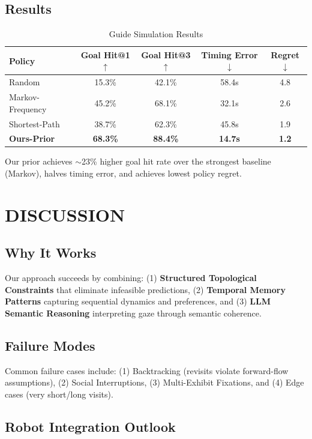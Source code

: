 \documentclass{letterpaper,article}
\begin{document}
\subsection{Results}

\begin{table}[h]
\centering
\caption{Guide Simulation Results}
\begin{tabular}{lcccc}
\toprule
Policy & Goal Hit@1$\uparrow$ & Goal Hit@3$\uparrow$ & Timing Error$\downarrow$ & Regret$\downarrow$ \\
\midrule
Random & 15.3\% & 42.1\% & 58.4s & 4.8 \\
Markov-Frequency & 45.2\% & 68.1\% & 32.1s & 2.6 \\
Shortest-Path & 38.7\% & 62.3\% & 45.8s & 1.9 \\
\rowcolor{green!10} \textbf{Ours-Prior} & \textbf{68.3\%} & \textbf{88.4\%} & \textbf{14.7s} & \textbf{1.2} \\
\bottomrule
\end{tabular}
\label{tab:simulation}
\end{table}

Our prior achieves $\sim$23\% higher goal hit rate over the strongest baseline (Markov), halves timing error, and achieves lowest policy regret.

\section{DISCUSSION}

\subsection{Why It Works}

Our approach succeeds by combining: (1) \textbf{Structured Topological Constraints} that eliminate infeasible predictions, (2) \textbf{Temporal Memory Patterns} capturing sequential dynamics and preferences, and (3) \textbf{LLM Semantic Reasoning} interpreting gaze through semantic coherence.

\subsection{Failure Modes}

Common failure cases include: (1) Backtracking (revisits violate forward-flow assumptions), (2) Social Interruptions, (3) Multi-Exhibit Fixations, and (4) Edge cases (very short/long visits).

\subsection{Robot Integration Outlook}
\end{document}
